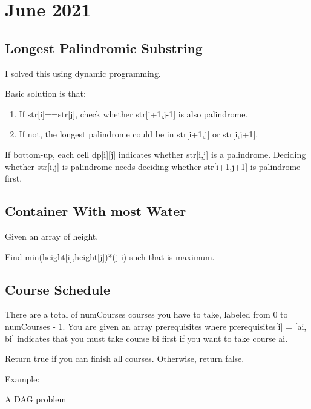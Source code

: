 \chapter{June 2021}

\section{Longest Palindromic Substring}

    I solved this using dynamic programming.

    Basic solution is that:
    \begin{enumerate}
        \item If str[i]==str[j], check whether str[i+1,j-1] is also palindrome.
        \item If not, the longest palindrome could be in str[i+1,j] or str[i,j+1].
    \end{enumerate}

    If bottom-up, each cell dp[i][j] indicates whether str[i,j] is 
    a palindrome. Deciding whether str[i,j] is palindrome needs 
    deciding whether str[i+1,j+1] is palindrome first.

\section{Container With most Water}

    Given an array of height.

    Find min(height[i],height[j])*(j-i) such that is maximum.
    
\section{Course Schedule}

    There are a total of numCourses courses you have to take, 
    labeled from 0 to numCourses - 1. 
    You are given an array prerequisites where prerequisites[i] = [ai, bi] 
    indicates that you must take course bi first if you want to take course ai.

    Return true if you can finish all courses. Otherwise, return false.

    Example: 


    A DAG problem